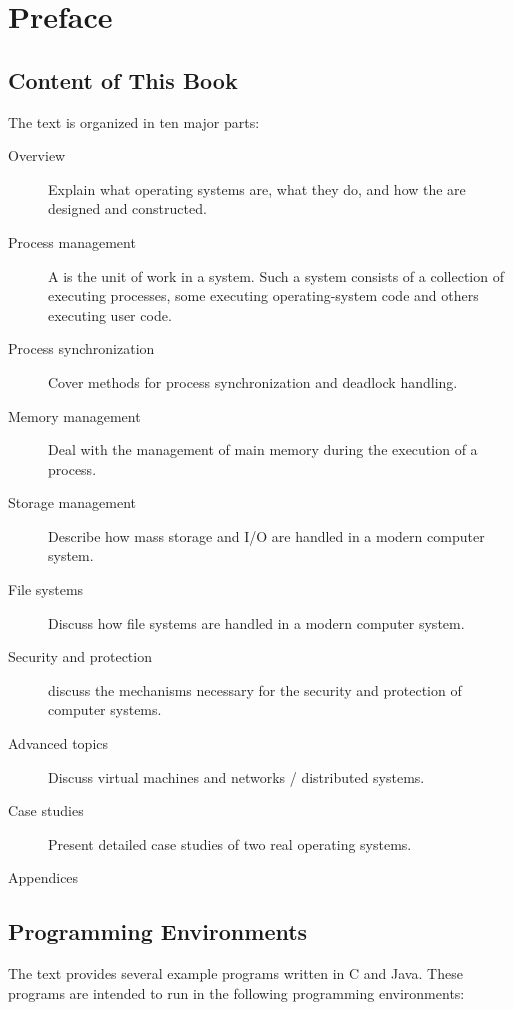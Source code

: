 
\chapter{Preface}
{
    \section{Content of This Book}
    {
        The text is organized in ten major parts:

        \begin{description}
            \item[Overview] Explain what operating systems are, what they do, and how the are designed and constructed.
            \item[Process management]
            {
                A  is the unit of work in a system.
                Such a system consists of a collection of  executing processes, some executing operating-system code and others executing user code.
            }
            \item[Process synchronization] Cover methods for process synchronization and deadlock handling.
            \item[Memory management] Deal with the management of main memory during the execution of a process.
            \item[Storage management] Describe how mass storage and I/O are handled in a modern computer system.
            \item[File systems] Discuss how file systems are handled in a modern computer system.
            \item[Security and protection] discuss the mechanisms necessary for the security and protection of computer systems.
            \item[Advanced topics] Discuss virtual machines and networks / distributed systems.
            \item[Case studies] Present detailed case studies of two real operating systems.
            \item[Appendices]
        \end{description}
    }

    \section{Programming Environments}
    {
        The text provides several example programs written in C and Java.
        These programs are intended to run in the following programming environments:

}}
